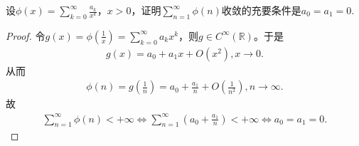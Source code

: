 \documentclass[../../main.tex]{subfiles}
\begin{document}
\begin{example}
设\(\phi(x) = \sum_{k = 0}^{\infty} \frac{a_k}{x^k}\)，\(x > 0\)，证明\(\sum_{n = 1}^{\infty} \phi(n)\)收敛的充要条件是\(a_0 = a_1 = 0\).
\end{example}
\begin{proof}
令\(g\left( x \right) =\phi \left( \frac{1}{x} \right) =\sum_{k=0}^{\infty}{a_kx^k}\)，则\(g\in C^{\infty}\left( \mathbb{R} \right)\)。于是
\begin{align*}
g\left( x \right) =a_0+a_1x+O\left( x^2 \right) ,x\rightarrow 0.
\end{align*}
从而
\begin{align*}
\phi \left( n \right) =g\left( \frac{1}{n} \right) =a_0+\frac{a_1}{n}+O\left( \frac{1}{n^2} \right) ,n\rightarrow \infty .
\end{align*}
故
\begin{align*}
\sum_{n=1}^{\infty}{\phi \left( n \right)}<+\infty \Longleftrightarrow \sum_{n=1}^{\infty}{\left( a_0+\frac{a_1}{n} \right)}<+\infty \Longleftrightarrow a_0=a_1=0.
\end{align*}

\end{proof}
\end{document}
